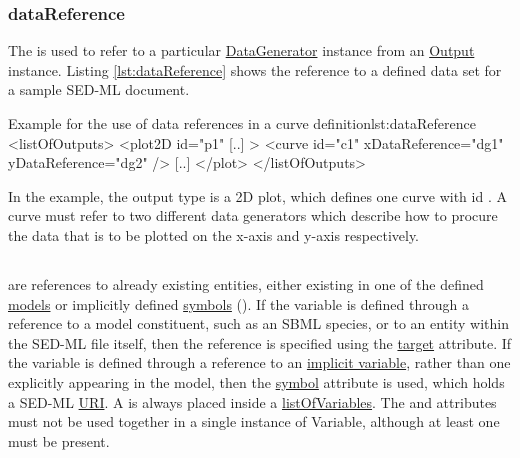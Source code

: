 \subsubsection{dataReference}
\label{sec:dataReference}
The  is used to refer to a particular \hyperref[class:dataGenerator]{DataGenerator} instance from an \hyperref[class:output]{Output} instance. Listing \ref{lst:dataReference} shows the reference to a defined data set for a sample SED-ML document. 

\begin{myXmlLst}{Example for the use of data references in a curve definition}{lst:dataReference}
<listOfOutputs>
  <plot2D id="p1" [..] >
    <curve id="c1" xDataReference="dg1" yDataReference="dg2" />
    [..]
  </plot>
</listOfOutputs>
\end{myXmlLst}

In the example, the output type is a 2D plot, which defines one curve with id . A curve must refer to two different data generators which describe how to procure the data that is to be plotted on the x-axis and y-axis respectively. 


\subsection{}
\label{class:variable}
 are references to already existing entities, either existing in one of the defined \hyperref[class:model]{models} or implicitly defined \hyperref[sec:symbol]{symbols} (). 
%
%
If the variable is defined through a reference to a model constituent, such as an SBML species, or to an entity within the SED-ML file itself, then the reference is specified using the \hyperref[sec:target]{target} attribute.
If the variable is defined through a reference to an \hyperref[sec:implicitVariable]{implicit variable}, rather than one explicitly appearing in the model, then the \hyperref[sec:symbol]{symbol} attribute is used, which holds a SED-ML \hyperref[sec:uriScheme]{URI}.
A  is always placed inside a \hyperref[sec:listOfVariables]{listOfVariables}.
The  and  attributes must not be used together in a single instance of Variable, although at least one must be present.

